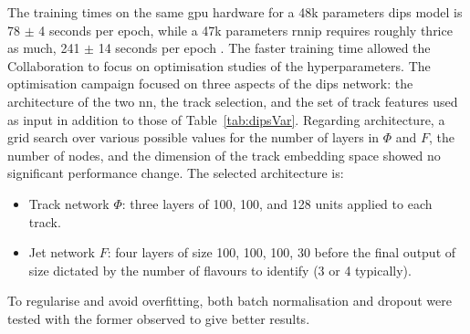 The training times on the same \gls{gpu} hardware for a 48k parameters \gls{dips} model is 78 $\pm$ 4 seconds per epoch, while a 47k parameters \gls{rnnip} requires roughly thrice as much, 241 $\pm$ 14 seconds per epoch \cite{ATL-PHYS-PUB-2020-014}. The faster training time allowed the Collaboration to focus on optimisation studies of the hyperparameters. The optimisation campaign focused on three aspects of the \gls{dips} network: the architecture of the two \gls{nn}, the track selection, and the set of track features used as input in addition to those of Table~\ref{tab:dipsVar}. Regarding architecture, a grid search over various possible values for the number of layers in $\Phi$ and $F$, the number of nodes, and the dimension of the track embedding space showed no significant performance change. The selected architecture is:
\begin{itemize}
  \item Track network $\Phi$: three layers of 100, 100, and 128 units applied to each track. 
  \item Jet network $F$: four layers of size 100, 100, 100, 30 before the final output of size dictated by the number of flavours to identify (3 or 4 typically). 
\end{itemize}
To regularise and avoid overfitting, both batch normalisation and dropout were tested with the former observed to give better results. \\ 


